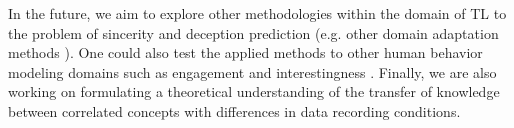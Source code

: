 \documentclass{article}
\begin{document}
In the future, we aim to explore other methodologies within the domain of TL to the problem of sincerity and deception prediction (e.g. other domain adaptation methods \cite{}).
One could also test the applied methods to other human behavior modeling domains such as engagement \cite{} and interestingness \cite{}.
Finally, we are also working on formulating a theoretical understanding of the transfer of knowledge between correlated concepts with differences in data recording conditions. 

\footnotesize{




}
\end{document}
